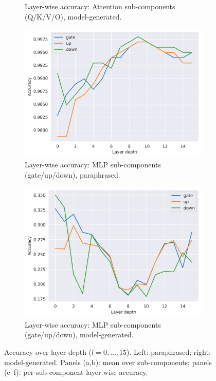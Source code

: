 \begin{figure}[htb]
\begin{subfigure}[h]{0.49\textwidth}
        \caption{Layer-wise accuracy: Attention sub-components (Q/K/V/O), model-generated.}  %
        \label{fig:accuracy_over_layer_depth_model_attention_generated}
    \end{subfigure}
    \begin{subfigure}[h]{0.49\textwidth}
        \centering
        \includegraphics[width=\textwidth]{figures/results/paraphrased/mlp_components.png}
        \caption{Layer-wise accuracy: MLP sub-components (gate/up/down), paraphrased.}       %
        \label{fig:accuracy_over_layer_depth_mlp_paraphrased}
    \end{subfigure}
    \hfill
    \begin{subfigure}[h]{0.49\textwidth}
        \centering
        \includegraphics[width=\textwidth]{figures/results/model-generated/mlp_components.png}
        \caption{Layer-wise accuracy: MLP sub-components (gate/up/down), model-generated.}   %
        \label{fig:accuracy_over_layer_depth_mlp_model_generated}
    \end{subfigure}
    \caption{Accuracy over layer depth ($l = 0, \ldots, 15$). Left: paraphrased; right: model-generated. Panels (a,b): mean over sub-components; panels (c–f): per-sub-component layer-wise accuracy.}
    \label{fig:accuracy_over_layer_depth}
\end{figure}

